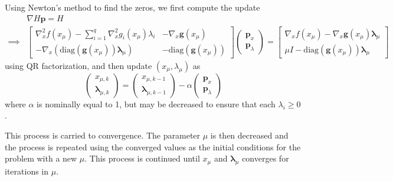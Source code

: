 \documentclass{article}
\begin{document}
	Using Newton's method to find the zeros, we first compute the update 
	\begin{align*}
	& \nabla H \mathbf{p} = H \\
	\implies & \begin{bmatrix}
					\nabla_x^2 f(x_\mu) - \sum_{i=1}^q \nabla_x^2 g_i(x_\mu) \lambda_i & -\nabla_x \mathbf{g}(x_\mu) \\
					-\nabla_x\left(\text{diag}(\mathbf{g}(x_\mu))\boldsymbol{\lambda}_{\mu}\right) & -\text{diag}(\mathbf{g}(x_\mu))
               \end{bmatrix}
               \begin{pmatrix} \mathbf{p}_x \\ \mathbf{p}_\lambda \end{pmatrix}	
               = \begin{bmatrix}
 					\nabla_x f(x_\mu) - \nabla_x \mathbf{g}(x_\mu) \boldsymbol{\lambda}_\mu \\
 					\mu I - \text{diag}(\mathbf{g}(x_\mu))\boldsymbol{\lambda}_{\mu}
 				\end{bmatrix}
	\end{align*}
	using QR factorization, and then update $(x_\mu, \lambda_\mu)$ as
\[
	\begin{pmatrix} x_{\mu, k} \\ \boldsymbol{\lambda}_{\mu, k} \end{pmatrix} 
	= \begin{pmatrix} x_{\mu, k-1} \\ \boldsymbol{\lambda}_{\mu, k-1} \end{pmatrix} - \alpha \begin{pmatrix} \mathbf{p}_x \\ \mathbf{p}_{\lambda} \end{pmatrix}
\]
where $\alpha$ is nominally equal to 1, but may be decreased to ensure that each $\lambda_i\geq 0$.

This process is carried to convergence.  The parameter $\mu$ is then decreased and the process is repeated using the converged values as the initial conditions for the problem with a new $\mu$.  This process is continued until $x_\mu$ and $\boldsymbol{\lambda}_{\mu}$ converges for iterations in $\mu$.
	
	
	

	












\end{document}
